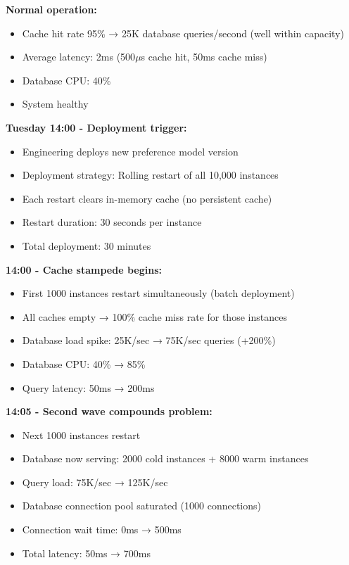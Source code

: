 \textbf{Normal operation:}
\begin{itemize}
    \item Cache hit rate 95\% → 25K database queries/second (well within capacity)
    \item Average latency: 2ms (500\ensuremath{\mu}s cache hit, 50ms cache miss)
    \item Database CPU: 40\%
    \item System healthy
\end{itemize}

\textbf{Tuesday 14:00 - Deployment trigger:}
\begin{itemize}
    \item Engineering deploys new preference model version
    \item Deployment strategy: Rolling restart of all 10,000 instances
    \item Each restart clears in-memory cache (no persistent cache)
    \item Restart duration: 30 seconds per instance
    \item Total deployment: 30 minutes
\end{itemize}

\textbf{14:00 - Cache stampede begins:}
\begin{itemize}
    \item First 1000 instances restart simultaneously (batch deployment)
    \item All caches empty → 100\% cache miss rate for those instances
    \item Database load spike: 25K/sec → 75K/sec queries (+200\%)
    \item Database CPU: 40\% → 85\%
    \item Query latency: 50ms → 200ms
\end{itemize}

\textbf{14:05 - Second wave compounds problem:}
\begin{itemize}
    \item Next 1000 instances restart
    \item Database now serving: 2000 cold instances + 8000 warm instances
    \item Query load: 75K/sec → 125K/sec
    \item Database connection pool saturated (1000 connections)
    \item Connection wait time: 0ms → 500ms
    \item Total latency: 50ms → 700ms
\end{itemize}

